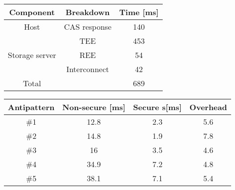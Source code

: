\begin{table*}
\begin{minipage}{.15\linewidth}
\centering
\begin{tabular}{ccc}
\toprule
{\bf  Component} & {\bf Breakdown} &  {\bf Time [ms]} \\
\midrule
Host & CAS response & 140 \\ 
\hline
\multirow{3}{*}{Storage server} & TEE & 453 \\
& REE & 54 \\
& Interconnect & 42 \\
\midrule
Total & & 689 \\
\bottomrule
\end{tabular}

\caption{Attestation breakdown.\label{tab:attest-table}}
\end{minipage}
\hfill
\begin{minipage}{.75\linewidth}{
\centering
\begin{tabular}{cccc}
\toprule
{\bf  Antipattern} & {\bf Non-secure [ms]} & {\bf Secure s[ms] } & {\bf Overhead} \\
\midrule
\#1 & 12.8 & 2.3 & 5.6\\ 
\hline
\#2 & 14.8 & 1.9 & 7.8\\ 
\hline
\#3 & 16 & 3.5 & 4.6\\ 
\hline
\#4 & 34.9 & 7.2 & 4.8\\ 
\hline
\#5 & 38.1 & 7.1 & 5.4\\ 

\bottomrule
\end{tabular}

\caption{Overheads of maintaining GDPR policy compliance\label{tab:policy-overheads}}
}
\end{minipage}
\end{table*}